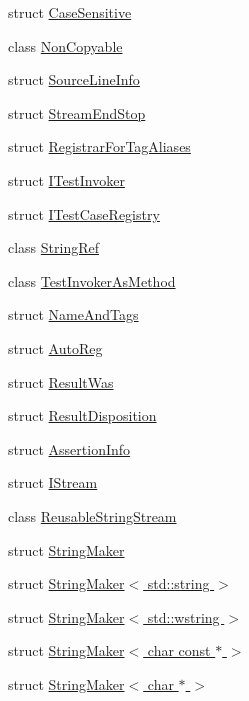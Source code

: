 \begin{DoxyCompactItemize}
\item 
struct \hyperlink{struct_catch_1_1_case_sensitive}{Case\-Sensitive}
\item 
class \hyperlink{class_catch_1_1_non_copyable}{Non\-Copyable}
\item 
struct \hyperlink{struct_catch_1_1_source_line_info}{Source\-Line\-Info}
\item 
struct \hyperlink{struct_catch_1_1_stream_end_stop}{Stream\-End\-Stop}
\item 
struct \hyperlink{struct_catch_1_1_registrar_for_tag_aliases}{Registrar\-For\-Tag\-Aliases}
\item 
struct \hyperlink{struct_catch_1_1_i_test_invoker}{I\-Test\-Invoker}
\item 
struct \hyperlink{struct_catch_1_1_i_test_case_registry}{I\-Test\-Case\-Registry}
\item 
class \hyperlink{class_catch_1_1_string_ref}{String\-Ref}
\item 
class \hyperlink{class_catch_1_1_test_invoker_as_method}{Test\-Invoker\-As\-Method}
\item 
struct \hyperlink{struct_catch_1_1_name_and_tags}{Name\-And\-Tags}
\item 
struct \hyperlink{struct_catch_1_1_auto_reg}{Auto\-Reg}
\item 
struct \hyperlink{struct_catch_1_1_result_was}{Result\-Was}
\item 
struct \hyperlink{struct_catch_1_1_result_disposition}{Result\-Disposition}
\item 
struct \hyperlink{struct_catch_1_1_assertion_info}{Assertion\-Info}
\item 
struct \hyperlink{struct_catch_1_1_i_stream}{I\-Stream}
\item 
class \hyperlink{class_catch_1_1_reusable_string_stream}{Reusable\-String\-Stream}
\item 
struct \hyperlink{struct_catch_1_1_string_maker}{String\-Maker}
\item 
struct \hyperlink{struct_catch_1_1_string_maker_3_01std_1_1string_01_4}{String\-Maker$<$ std\-::string $>$}
\item 
struct \hyperlink{struct_catch_1_1_string_maker_3_01std_1_1wstring_01_4}{String\-Maker$<$ std\-::wstring $>$}
\item 
struct \hyperlink{struct_catch_1_1_string_maker_3_01char_01const_01_5_01_4}{String\-Maker$<$ char const $\ast$ $>$}
\item 
struct \hyperlink{struct_catch_1_1_string_maker_3_01char_01_5_01_4}{String\-Maker$<$ char $\ast$ $>$}

\end{DoxyCompactItemize}
